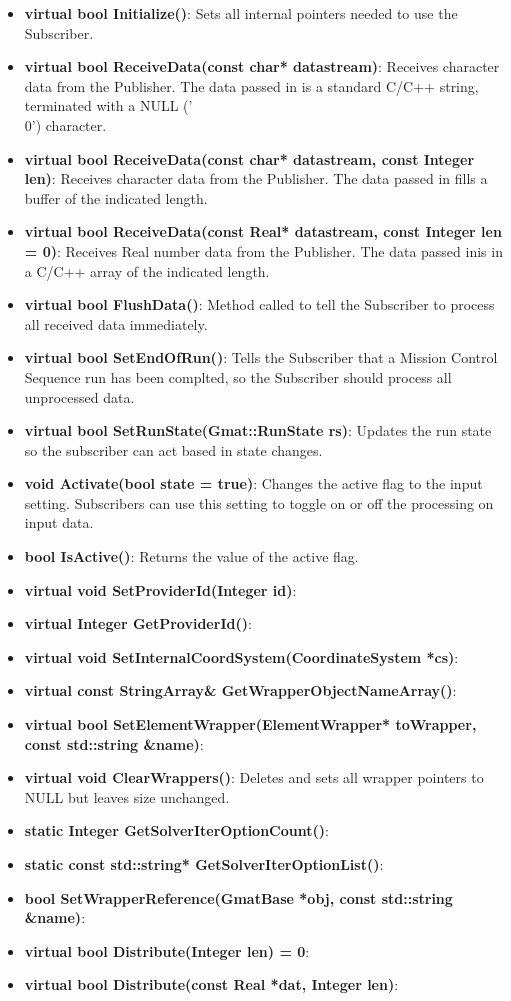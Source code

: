\begin{itemize}
\item \textbf{virtual bool Initialize()}:  Sets all internal pointers needed to use the Subscriber.
\item \textbf{virtual bool ReceiveData(const char* datastream)}: Receives character data from the
Publisher.  The data passed in is a standard C/C++ string, terminated with a NULL ('\\0')
character.
\item \textbf{virtual bool ReceiveData(const char* datastream, const Integer len)}: Receives
character data from the Publisher.  The data passed in fills a buffer of the indicated length.
\item \textbf{virtual bool ReceiveData(const Real* datastream, const Integer len = 0)}: Receives
Real number data from the Publisher.  The data passed inis in a C/C++ array of the indicated length.
\item \textbf{virtual bool FlushData()}: Method called to tell the Subscriber to process all
received data immediately.
\item \textbf{virtual bool SetEndOfRun()}: Tells the Subscriber that a Mission Control Sequence run
has been complted, so the Subscriber should process all unprocessed data.
\item \textbf{virtual bool SetRunState(Gmat::RunState rs)}: Updates the run state so the subscriber
can act based in state changes.
\item \textbf{void Activate(bool state = true)}: Changes the active flag to the input setting.
Subscribers can use this setting to toggle on or off the processing on input data.
\item \textbf{bool IsActive()}: Returns the value of the active flag.
\item \textbf{virtual void SetProviderId(Integer id)}:
\item \textbf{virtual Integer GetProviderId()}:
\item \textbf{virtual void SetInternalCoordSystem(CoordinateSystem *cs)}:
\item \textbf{virtual const StringArray\& GetWrapperObjectNameArray()}:
\item \textbf{virtual bool SetElementWrapper(ElementWrapper* toWrapper, const std::string \&name)}:
\item \textbf{virtual void ClearWrappers()}: Deletes and sets all wrapper pointers to NULL but
leaves size unchanged.
\item \textbf{static Integer GetSolverIterOptionCount()}:
\item \textbf{static const std::string* GetSolverIterOptionList()}:
\item \textbf{bool SetWrapperReference(GmatBase *obj, const std::string \&name)}:
\item \textbf{virtual bool Distribute(Integer len) = 0}:
\item \textbf{virtual bool Distribute(const Real *dat, Integer len)}:
\end{itemize}

